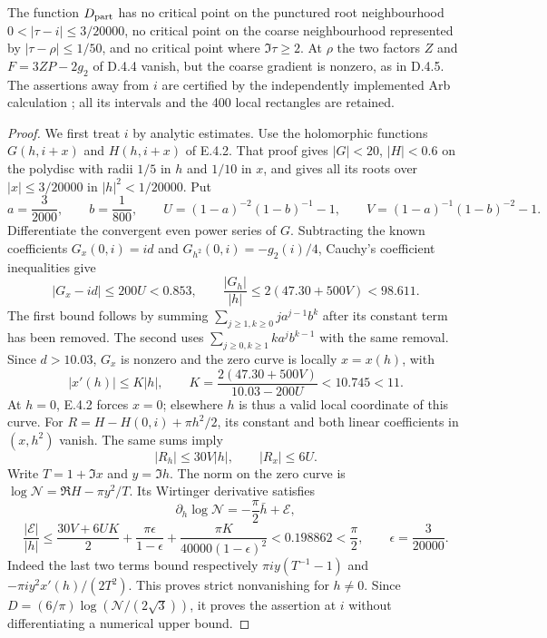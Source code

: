 \begin{proposition}[D.4.7; Proved]
The function $D_{\rm part}$ has no critical point on the punctured
root neighbourhood $0<|\tau-i|\leq3/20000$, no critical point on the
coarse neighbourhood represented by $|\tau-\rho|\leq1/50$, and no
critical point where $\Im\tau\geq2$. At $\rho$ the two factors
$Z$ and $F=3ZP-2g_2$ of D.4.4 vanish, but the coarse gradient is
nonzero, as in D.4.5. The assertions away from $i$ are certified by
the independently implemented Arb calculation
; all its intervals and
the 400 local rectangles are retained.
\end{proposition}
\begin{proof}
We first treat $i$ by analytic estimates. Use the holomorphic
functions $G(h,i+x)$ and $H(h,i+x)$ of E.4.2. That proof gives
$|G|<20$, $|H|<0.6$ on the polydisc with radii $1/5$ in $h$ and
$1/10$ in $x$, and gives all its roots over $|x|\leq3/20000$ in
$|h|^2<1/20000$. Put
\[
 a=\frac3{2000},\qquad b=\frac1{800},\qquad
 U=(1-a)^{-2}(1-b)^{-1}-1,\qquad
 V=(1-a)^{-1}(1-b)^{-2}-1.
\]
Differentiate the convergent even power series of $G$. Subtracting
the known coefficients $G_x(0,i)=id$ and
$G_{h^2}(0,i)=-g_2(i)/4$, Cauchy's coefficient inequalities give
\[
 |G_x-id|\leq200U<0.853,\qquad
 \frac{|G_h|}{|h|}\leq2(47.30+500V)<98.611.
\]
The first bound follows by summing
$\sum_{j\geq1,k\geq0}j a^{j-1}b^k$ after its constant term
has been removed. The second uses
$\sum_{j\geq0,k\geq1}k a^j b^{k-1}$ with the same removal.
Since $d>10.03$, $G_x$ is nonzero and the zero curve is locally
$x=x(h)$, with
\[
 |x'(h)|\leq K|h|,\qquad
 K=\frac{2(47.30+500V)}{10.03-200U}<10.745<11.
\]
At $h=0$, E.4.2 forces $x=0$; elsewhere $h$ is thus a valid local
coordinate of this curve. For
$R=H-H(0,i)+\pi h^2/2$, its constant and both linear coefficients
in $(x,h^2)$ vanish. The same sums imply
\[
 |R_h|\leq30V|h|,\qquad |R_x|\leq6U.
\]
Write $T=1+\Im x$ and $y=\Im h$. The norm on the zero curve is
$\log\mathcal N=\Re H-\pi y^2/T$. Its Wirtinger derivative satisfies
\[
 \partial_h\log\mathcal N
 =-\frac\pi2\bar h+\mathcal E,
\]
\[
 \frac{|\mathcal E|}{|h|}
 \leq\frac{30V+6UK}{2}
 +\frac{\pi\epsilon}{1-\epsilon}
 +\frac{\pi K}{40000(1-\epsilon)^2}
 <0.198862<\frac\pi2,\qquad \epsilon=\frac3{20000}.
\]
Indeed the last two terms bound respectively
$\pi i y(T^{-1}-1)$ and
$-\pi i y^2x'(h)/(2T^2)$. This proves strict nonvanishing for
$h\ne0$. Since $D=(6/\pi)\log(\mathcal N/(2\sqrt3))$, it proves
the assertion at $i$ without differentiating a numerical upper bound.


\end{proof}
